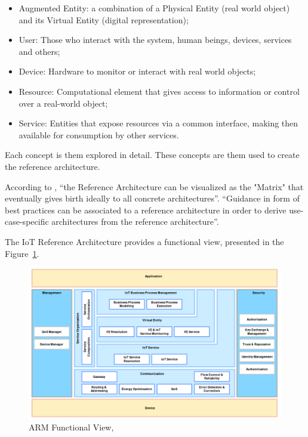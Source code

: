 \begin{itemize}
    \item Augmented Entity: a combination of a Physical Entity (real world object) and its Virtual Entity (digital representation);
    \item User: Those who interact with the system, human beings, devices, services and others;
    \item Device: Hardware to monitor or interact with real world objects;
    \item Resource: Computational element that gives access to information or control over a real-world object;
    \item Service: Entities that expose resources via a common interface, making then available for consumption by other services.
\end{itemize}

Each concept is them explored in detail. These concepts are them used to create the reference architecture.

According to , ``the Reference Architecture can be visualized as the "Matrix" that eventually gives birth ideally to all concrete architectures''. ``Guidance in form of best practices can be associated to a reference architecture in order to derive use-case-specific architectures from the reference architecture''.

The IoT Reference Architecture provides a functional view, presented in the Figure~\ref{fig:stateofart:arch:iota:functional}.

\begin{figure}[H]
    \centering
    \includegraphics[scale=0.5]{
        assets/figures/arm-functional-view.png
    }
    \caption[ARM Functional View]{ARM Functional View, \cite{iot-arm-functional}}
    \label{fig:stateofart:arch:iota:functional}
\end{figure}


